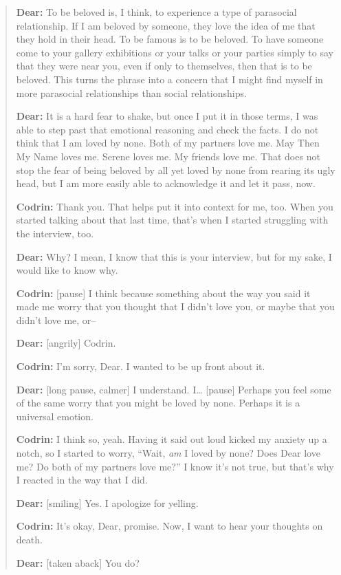 \begin{quote}
\textbf{Dear:} To be beloved is, I think, to experience a type of parasocial relationship. If I am beloved by someone, they love the idea of me that they hold in their head. To be famous is to be beloved. To have someone come to your gallery exhibitions or your talks or your parties simply to say that they were near you, even if only to themselves, then that is to be beloved. This turns the phrase into a concern that I might find myself in more parasocial relationships than social relationships.

\textbf{Dear:} It is a hard fear to shake, but once I put it in those terms, I was able to step past that emotional reasoning and check the facts. I do not think that I am loved by none. Both of my partners love me. May Then My Name loves me. Serene loves me. My friends love me. That does not stop the fear of being beloved by all yet loved by none from rearing its ugly head, but I am more easily able to acknowledge it and let it pass, now.

\textbf{Codrin:} Thank you. That helps put it into context for me, too. When you started talking about that last time, that's when I started struggling with the interview, too.

\textbf{Dear:} Why? I mean, I know that this is your interview, but for my sake, I would like to know why.

\textbf{Codrin:} {[}pause{]} I think because something about the way you said it made me worry that you thought that I didn't love you, or maybe that you didn't love me, or--

\textbf{Dear:} {[}angrily{]} Codrin.

\textbf{Codrin:} I'm sorry, Dear. I wanted to be up front about it.

\textbf{Dear:} {[}long pause, calmer{]} I understand. I\ldots{} {[}pause{]} Perhaps you feel some of the same worry that you might be loved by none. Perhaps it is a universal emotion.

\textbf{Codrin:} I think so, yeah. Having it said out loud kicked my anxiety up a notch, so I started to worry, ``Wait, \emph{am} I loved by none? Does Dear love me? Do both of my partners love me?'' I know it's not true, but that's why I reacted in the way that I did.

\textbf{Dear:} {[}smiling{]} Yes. I apologize for yelling.

\textbf{Codrin:} It's okay, Dear, promise. Now, I want to hear your thoughts on death.

\textbf{Dear:} {[}taken aback{]} You do?


\end{quote}
